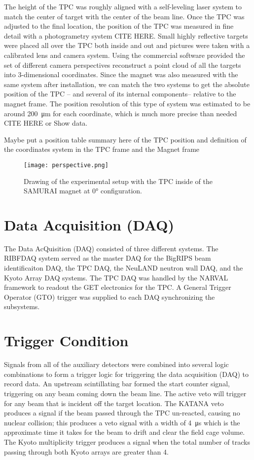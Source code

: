 The height of the TPC was roughly aligned with a self-leveling laser system to match the center of target with the center of the beam line. Once the TPC was adjusted to the final location, the position of the TPC was measured in fine detail with a photogrametry system CITE HERE. Small highly reflective targets were placed all over the TPC both inside and out and pictures were taken with a calibrated lens and camera system. Using the commercial software provided the set of different camera perspectives reconstruct a point cloud of all the targets into 3-dimensional coordinates. Since the magnet was also measured with the same system after installation, we can match the two systems to get the absolute position of the TPC -- and several of its internal components-- relative to the magnet frame. The position resolution of this type of system was estimated to be around \SI{200}{\micro\metre} for each coordinate, which is much more precise than needed CITE HERE or Show data.

Maybe put a position table summary here of the TPC position and definition of the coordinates system in the TPC frame and the Magnet frame


\begin{figure}
\texttt{[image: perspective.png]}
\caption{Drawing of the experimental setup with the TPC inside of the SAMURAI magnet at $\ang{0}$ configuration.}
\label{fig:experiment}
\end{figure}


\section{Data Acquisition (DAQ) }
The Data AcQuisition (DAQ) consisted of three different systems. The RIBFDAQ system served as the master DAQ for the BigRIPS beam identificaiton DAQ, the TPC DAQ, the NeuLAND neutron wall DAQ, and the Kyoto Array DAQ systems. The TPC DAQ was handled by the NARVAL framework to readout the GET electronics for the \spirit TPC. A General Trigger Operator (GTO) trigger was supplied to each DAQ synchronizing the subsystems. 

\section{Trigger Condition}
Signals from all of the auxiliary detectors were combined into several logic combinations to form a trigger logic for triggering the data acquisition  (DAQ) to record data. An upstream scintillating bar formed the start counter signal, triggering on any beam coming down the beam line. The active veto will trigger for any beam that is incident off the target location. The KATANA veto produces a signal if the beam passed through the TPC un-reacted, causing no nuclear collision; this produces a veto signal with a width of \SI{4}{\micro\second} which is the approximate time it takes for the beam to drift and clear the field cage volume. The Kyoto multiplicity trigger produces a signal when the total number of tracks passing through both Kyoto arrays are greater than 4. 


